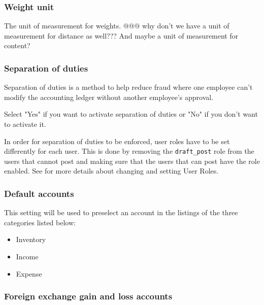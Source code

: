 \subsubsection{Weight unit}
\label{subsubsec-company-config-defaults-weight-unit}
   The unit of measurement for weights. @@@ why don't we have a unit of measurement for distance as well??? And maybe a unit of measurement for content?
   
\subsubsection{Separation of duties}
\label{subsubsec-company-config-defaults-separation-of-duties}


Separation of duties  is a method to help reduce fraud where one employee can't modify the
accounting ledger without another employee's approval.

Select "Yes" if you want to activate separation of duties or "No" if you don't
want to activate it.

In order for separation of duties to be enforced, user roles have to be set differently for each user. This is done by removing the \texttt{draft\_post} role from the users that cannot post and making sure that the users that can post have the role enabled.  See  for more details about changing and setting User Roles.

\subsubsection{Default accounts}
\label{subsubsec-company-config-defaults-accounts}

This setting will be used to preselect an account in
the listings of the three categories listed below:
\begin{itemize}
\item Inventory
\item Income
\item Expense
\end{itemize}


\subsubsection{Foreign exchange gain and loss accounts}
\label{subsubsec-company-config-defaults-fx-accounts}

